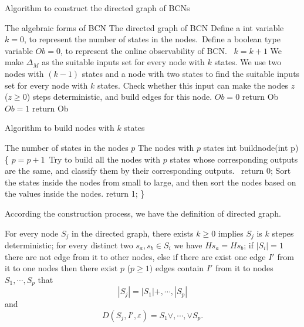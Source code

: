 \begin{algorithm}[h]
\caption{Algorithm to construct the directed graph of BCNs}
\begin{algorithmic}[1]
\REQUIRE 
The algebraic forms of BCN
\ENSURE  
The directed graph of BCN
\STATE Define a int variable $k=0$, to represent the number of states in the nodes.\
\STATE Define a boolean type variable $Ob=0$, to represent the online observability of BCN.\
\STATE $k= k+1$
\STATE We make $\Delta_M$ as the suitable inputs set for every node with $k$ states.
\ELSE
\IF{$k>2$}
\STATE We use two nodes with $(k-1)$ states and a node with two states to find the suitable inputs set for every node with $k$ states. 
\ENDIF
\ENDIF
{}
\STATE Check whether this input can make the nodes $z$ ($z\ge0$) steps deterministic, and build edges for this node.
\ENDFOR
\ENDFOR
{}
\STATE $Ob=0$ return Ob
\ENDIF
\ENDWHILE
\STATE $Ob=1$ return Ob
\end{algorithmic}
 \label{alg:1}
\end{algorithm}

\begin{algorithm}[h]
\caption{Algorithm to build nodes with $k$ states}
\begin{algorithmic}[1]
\REQUIRE 
The number of states in the nodes $p$
\ENSURE  
The nodes with $p$ states
\STATE int buildnode(int p)
\STATE  \{ 
\STATE $p=p+1$\
\STATE  Try to build all the nodes with $p$ states whose corresponding outputs are the same, and classify them by their corresponding outputs.\
\STATE  return 0;
\ELSE 
\STATE Sort the states inside the nodes from small to large, and then sort the nodes based on the values inside the nodes. %
\STATE return 1;
\ENDIF 
\STATE \}
\end{algorithmic}
 \label{alg:2}
\end{algorithm}

According the construction process, we have the definition of directed graph.
\begin{definition}[Directed Graph]
For every node $S_j$ in the directed graph, there exists $ k \ge 0$ implies $S_j$ is $k$ stepes deterministic; for every distinct two $s_a, s_b \in S_i$ we have $Hs_a=Hs_b$; if $|S_i|=1$ there are not edge from it to other nodes, else if there are exist one edge $I'$ from it to one nodes then there exist $p$ ($p\ge 1)$ edges contain $I'$ from it to nodes $S_1,\cdots,S_p$ that \[|S_j|= |S_1|+,\cdots,|S_p|\] and \[D\left(S_j,I',\varepsilon\right)=S_1\vee,\cdots,\vee S_p.\]
\end{definition}

